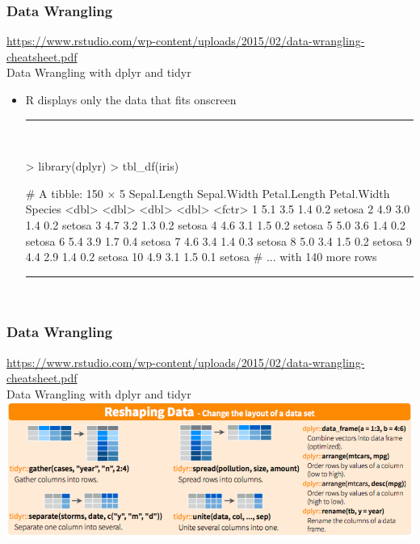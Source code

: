 \documentclass{beamer}
\begin{document}
\begin{frame}[fragile]
	\frametitle{Data Wrangling}
	\centering \tiny \url{https://www.rstudio.com/wp-content/uploads/2015/02/data-wrangling-cheatsheet.pdf}\\
	\centering \Large Data Wrangling with dplyr and tidyr
	\begin{itemize}
	\small

	\item R displays only the data that fits onscreen
		\vspace{5pt}
\rule{\textwidth}{0.4pt}\\
\tiny
\setlength{\fancyvrbtopsep}{-1pt}
\setlength{\fancyvrbpartopsep}{-1pt}
\begin{Schunk}
\begin{Sinput}
> library(dplyr)
> tbl_df(iris)
\end{Sinput}
\begin{Soutput}
# A tibble: 150 × 5
   Sepal.Length Sepal.Width Petal.Length Petal.Width Species
          <dbl>       <dbl>        <dbl>       <dbl>  <fctr>
1           5.1         3.5          1.4         0.2  setosa
2           4.9         3.0          1.4         0.2  setosa
3           4.7         3.2          1.3         0.2  setosa
4           4.6         3.1          1.5         0.2  setosa
5           5.0         3.6          1.4         0.2  setosa
6           5.4         3.9          1.7         0.4  setosa
7           4.6         3.4          1.4         0.3  setosa
8           5.0         3.4          1.5         0.2  setosa
9           4.4         2.9          1.4         0.2  setosa
10          4.9         3.1          1.5         0.1  setosa
# ... with 140 more rows
\end{Soutput}
\end{Schunk}
\rule{\textwidth}{0.4pt}\\
\small
	\end{itemize}
\end{frame}

\begin{frame}[fragile]
	\frametitle{Data Wrangling}
	\centering \tiny \url{https://www.rstudio.com/wp-content/uploads/2015/02/data-wrangling-cheatsheet.pdf}\\
	\centering \Large Data Wrangling with dplyr and tidyr
	\vspace{5pt}
	\includegraphics{figures/dp2.png}

\end{frame}
\end{document}
